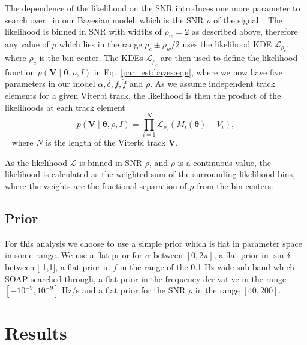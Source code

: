 The dependence of the likelihood on the \gls{SNR} introduces one more parameter
to search over~ in our
Bayesian model, which is the \gls{SNR} $\rho$ of the signal~.  The likelihood is binned in \gls{SNR} with widths of $\rho_w = 2$ as described above, therefore any value of $\rho$ which lies in the range $\rho_c \pm \rho_w/2 $ uses the likelihood \gls{KDE} $\mathcal{L}_{\rho_c}$, where $\rho_c$ is the bin center.
The \glspl{KDE} $\mathcal{L}_{\rho_c}$ are then used to define the likelihood function $p(\bm{V} \mid
\bm{\theta}, \rho, I)$ in Eq.~\ref{par_est:bayes:eqn}, where we now have five parameters in our model
$\alpha, \delta, f, \dot{f}$ and $\rho$.  As we assume
independent track elements for a given Viterbi track, the likelihood is then the product of the likelihoods at each track element
%
\begin{equation} 
p(\bm{V} \mid \bm{\theta}, \rho, I) = \prod_{i =
1}^{N} \mathcal{L}_{\rho_c}(M_i(\bm{\theta}) - V_i) , 
\end{equation} 
%
~
where $N$ is the length of the Viterbi track $\bm{V}$. 

\if
As the likelihood $\mathcal{L}$ is binned in \gls{SNR} $\rho$, and $\rho$ is a
continuous value, the likelihood is calculated as the weighted sum of the
surrounding likelihood bins, where the weights are the fractional separation of
$\rho$ from the bin centers.  
\fi

%
\subsection{Prior}
%
For this analysis we choose to use a simple prior which is flat in parameter space in some range.  We use a flat prior for $\alpha$
between $[0,2\pi]$, a flat prior in $\sin{\delta}$ between [-1,1], a flat prior
in $f$ in the range of the 0.1 Hz wide sub-band which SOAP searched through, a
flat prior in the frequency derivative in the range
$[-10^{-9},10^{-9}]$ Hz/s and a flat prior for the \gls{SNR} $\rho$ in
the range $[40,200]$.


\section{\label{par_est:results}Results}

